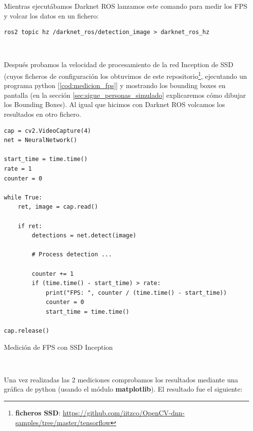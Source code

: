 Mientras ejecutábamos Darknet ROS lanzamos este comando para medir los FPS y volcar los datos en un fichero:\\

\begin{lstlisting}
ros2 topic hz /darknet_ros/detection_image > darknet_ros_hz
\end{lstlisting}\

Después probamos la velocidad de procesamiento de la red Inception de SSD (cuyos ficheros de configuración los obtuvimos de este repositorio\footnote{\textbf{ficheros SSD}: \url{https://github.com/iitzco/OpenCV-dnn-samples/tree/master/tensorflow}}, ejecutando un programa python [\ref{cod:medicion_fps}] y mostrando los bounding boxes en pantalla (en la sección \ref{sec:sigue_personas_simulado} explicaremos cómo dibujar los Bounding Boxes). Al igual que hicimos con Darknet ROS volcamos los resultados en otro fichero.\\

\begin{code}[H]
\begin{lstlisting}
cap = cv2.VideoCapture(4)
net = NeuralNetwork()

start_time = time.time()
rate = 1
counter = 0

while True:
	ret, image = cap.read()
	
	if ret:
		detections = net.detect(image)
		
		# Process detection ...

		counter += 1
		if (time.time() - start_time) > rate:
			print("FPS: ", counter / (time.time() - start_time))
			counter = 0
			start_time = time.time()

cap.release()
\end{lstlisting}
\caption{Medición de FPS con SSD Inception}
\label{cod:medicion_fps}
\end{code}\

Una vez realizadas las 2 mediciones comprobamos los resultados mediante una gráfica de python (usando el módulo \textbf{matplotlib}). El resultado fue el siguiente:\\

